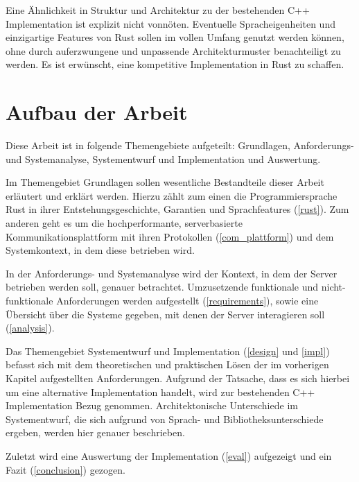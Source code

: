 Eine Ähnlichkeit in Struktur und Architektur zu der bestehenden C++ Implementation ist explizit nicht vonnöten.
Eventuelle Spracheigenheiten und einzigartige Features von Rust sollen im vollen Umfang genutzt werden können, ohne durch auferzwungene und unpassende Architekturmuster benachteiligt zu werden.
Es ist erwünscht, eine kompetitive Implementation in Rust zu schaffen.


\section{Aufbau der Arbeit}

Diese Arbeit ist in folgende Themengebiete aufgeteilt: Grundlagen, Anforderungs- und Systemanalyse, Systementwurf und Implementation und Auswertung.

Im Themengebiet Grundlagen sollen wesentliche Bestandteile dieser Arbeit erläutert und erklärt werden.
Hierzu zählt zum einen die Programmiersprache Rust in ihrer Entstehungsgeschichte, Garantien  und Sprachfeatures  (\autoref{rust}).
Zum anderen geht es um die hochperformante, serverbasierte Kommunikationsplattform mit ihren Protokollen (\autoref{com_plattform}) und dem Systemkontext, in dem diese betrieben wird.

In der Anforderungs- und Systemanalyse wird der Kontext, in dem der Server betrieben werden soll, genauer betrachtet. Umzusetzende funktionale und nicht-funktionale Anforderungen werden aufgestellt (\autoref{requirements}), sowie eine Übersicht über die Systeme gegeben, mit denen der Server interagieren soll (\autoref{analysis}).

Das Themengebiet Systementwurf und Implementation (\autoref{design} und \autoref{impl}) befasst sich mit dem theoretischen und praktischen Lösen der im vorherigen Kapitel aufgestellten Anforderungen. Aufgrund der Tatsache, dass es sich hierbei
um eine alternative Implementation handelt, wird zur bestehenden C++ Implementation Bezug genommen.
Architektonische Unterschiede im Systementwurf, die sich aufgrund von Sprach- und Bibliotheksunterschiede ergeben, werden hier genauer beschrieben.

Zuletzt wird eine Auswertung der Implementation (\autoref{eval}) aufgezeigt und ein Fazit (\autoref{conclusion}) gezogen.
